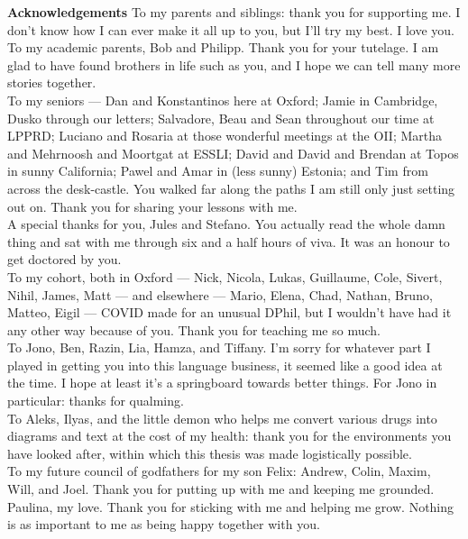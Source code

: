\clearpage
\newpage
\vfill
\begin{myboxB}
\textbf{Acknowledgements}
To my parents and siblings: thank you for supporting me. I don't know how I can ever make it all up to you, but I'll try my best. I love you.\\

To my academic parents, Bob and Philipp. Thank you for your tutelage. I am glad to have found brothers in life such as you, and I hope we can tell many more stories together.\\

To my seniors --- Dan and Konstantinos here at Oxford; Jamie in Cambridge, Dusko through our letters; Salvadore, Beau and Sean throughout our time at LPPRD; Luciano and Rosaria at those wonderful meetings at the OII; Martha and Mehrnoosh and Moortgat at ESSLI; David and David and Brendan at Topos in sunny California; Pawel and Amar in (less sunny) Estonia; and Tim from across the desk-castle. You walked far along the paths I am still only just setting out on. Thank you for sharing your lessons with me.\\

A special thanks for you, Jules and Stefano. You actually read the whole damn thing and sat with me through six and a half hours of viva. It was an honour to get doctored by you.\\

To my cohort, both in Oxford --- Nick, Nicola, Lukas, Guillaume, Cole, Sivert, Nihil, James, Matt --- and elsewhere --- Mario, Elena, Chad, Nathan, Bruno, Matteo, Eigil --- COVID made for an unusual DPhil, but I wouldn't have had it any other way because of you. Thank you for teaching me so much.\\

To Jono, Ben, Razin, Lia, Hamza, and Tiffany. I'm sorry for whatever part I played in getting you into this language business, it seemed like a good idea at the time. I hope at least it's a springboard towards better things. For Jono in particular: thanks for qualming.\\

To Aleks, Ilyas, and the little demon who helps me convert various drugs into diagrams and text at the cost of my health: thank you for the environments you have looked after, within which this thesis was made logistically possible.\\

To my future council of godfathers for my son Felix: Andrew, Colin, Maxim, Will, and Joel. Thank you for putting up with me and keeping me grounded.\\

Paulina, my love. Thank you for sticking with me and helping me grow. Nothing is as important to me as being happy together with you.
\end{myboxB}
